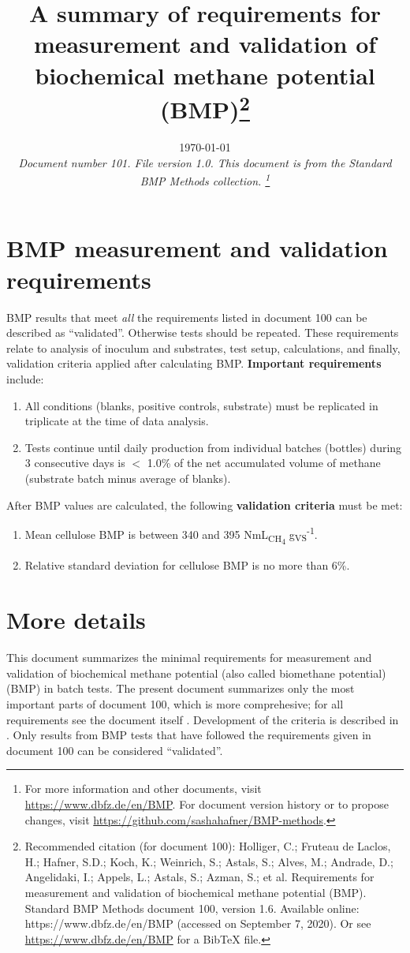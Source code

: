 \documentclass[]{article}
\title {A summary of requirements for measurement and validation of biochemical methane potential (BMP)\footnote{
  Recommended citation (for document 100): 
Holliger, C.; Fruteau de Laclos, H.; Hafner, S.D.; Koch, K.; Weinrich, S.; Astals, S.; Alves, M.; Andrade, D.; Angelidaki, I.; Appels, L.; Astals, S.; Azman, S.; et al. Requirements for measurement and validation of biochemical methane potential (BMP). Standard BMP Methods document 100, version 1.6. Available online: https://www.dbfz.de/en/BMP (accessed on September 7, 2020).
\newline
  Or see \url{https://www.dbfz.de/en/BMP} for a BibTeX file.
}\vspace{-4ex}}
\author{
}
\date{\today \\
\bigskip
\textit{
  Document number 101.
  File version 1.0. 
  This document is from the Standard BMP Methods collection.
    \footnote{For more information and other documents, visit \url{https://www.dbfz.de/en/BMP}. 
    For document version history or to propose changes, visit \url{https://github.com/sashahafner/BMP-methods}.}
}
}
\begin{document}
\maketitle

\section{BMP measurement and validation requirements}
\label{sec:crit}
BMP results that meet \textit{all} the requirements listed in document 100 \citep{BMPdoc100req} can be described as ``validated''.
Otherwise tests should be repeated.
These requirements relate to analysis of inoculum and substrates, test setup, calculations, and finally, validation criteria applied after calculating BMP.
\textbf{Important requirements} include:
\begin{enumerate}
  \item All conditions (blanks, positive controls, substrate) must be replicated in triplicate at the time of data analysis.
  \item Tests continue until daily  production from individual batches (bottles) during 3 consecutive days is $<$ 1.0\% of the net accumulated volume of methane (substrate batch minus average of blanks). 
\end{enumerate}
After BMP values are calculated, the following \textbf{validation criteria} must be met:
\begin{enumerate}
  \item Mean cellulose BMP is between 340 and 395 NmL\textsubscript{CH\textsubscript{4}} g\textsubscript{VS}\textsuperscript{-1}.
  \item Relative standard deviation for cellulose BMP is no more than 6\%.
\end{enumerate}
\vspace{7mm}

\section{More details}
This document summarizes the minimal requirements for measurement and validation of biochemical methane potential (also called biomethane potential) (BMP) in batch tests.
The present document summarizes only the most important parts of document 100, which is more comprehesive; for all requirements see the document itself \citep{BMPdoc100req}.
Development of the criteria is described in \citet{hafnerImprovingInterlaboratoryReproducibility2020}.
Only results from BMP tests that have followed the requirements given in document 100 \citep{BMPdoc100req} can be considered ``validated''.


\end{document}
